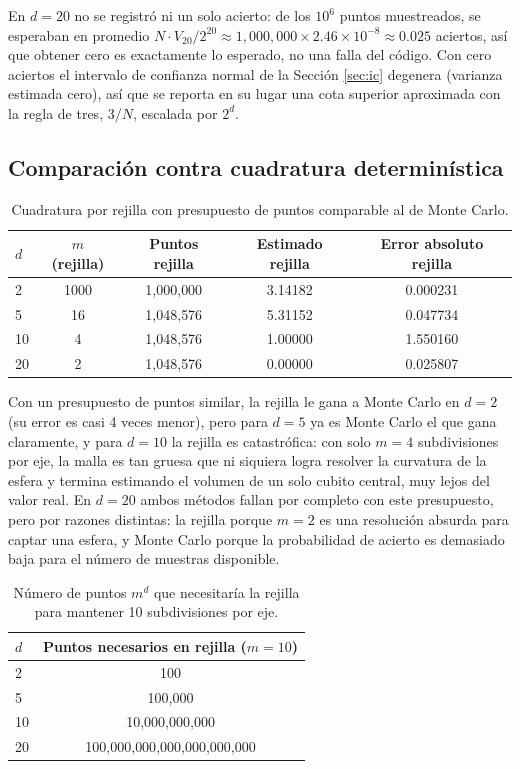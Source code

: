 \documentclass[11pt]{article}
\begin{document}
En $d=20$ no se registró ni un solo acierto: de los $10^6$ puntos muestreados, se esperaban en promedio $N \cdot V_{20}/2^{20} \approx 1{,}000{,}000 \times 2.46\times 10^{-8} \approx 0.025$ aciertos, así que obtener cero es exactamente lo esperado, no una falla del código. Con cero aciertos el intervalo de confianza normal de la Sección \ref{sec:ic} degenera (varianza estimada cero), así que se reporta en su lugar una cota superior aproximada con la regla de tres, $3/N$, escalada por $2^d$.

\subsection{Comparación contra cuadratura determinística}

\begin{table}[H]
\centering
\begin{tabular}{lcccc}
\toprule
$d$ & $m$ (rejilla) & Puntos rejilla & Estimado rejilla & Error absoluto rejilla \\
\midrule
2 & 1000 & 1{,}000{,}000 & 3.14182 & 0.000231 \\
5 & 16 & 1{,}048{,}576 & 5.31152 & 0.047734 \\
10 & 4 & 1{,}048{,}576 & 1.00000 & 1.550160 \\
20 & 2 & 1{,}048{,}576 & 0.00000 & 0.025807 \\
\bottomrule
\end{tabular}
\caption{Cuadratura por rejilla con presupuesto de puntos comparable al de Monte Carlo.}
\end{table}

Con un presupuesto de puntos similar, la rejilla le gana a Monte Carlo en $d=2$ (su error es casi 4 veces menor), pero para $d=5$ ya es Monte Carlo el que gana claramente, y para $d=10$ la rejilla es catastrófica: con solo $m=4$ subdivisiones por eje, la malla es tan gruesa que ni siquiera logra resolver la curvatura de la esfera y termina estimando el volumen de un solo cubito central, muy lejos del valor real. En $d=20$ ambos métodos fallan por completo con este presupuesto, pero por razones distintas: la rejilla porque $m=2$ es una resolución absurda para captar una esfera, y Monte Carlo porque la probabilidad de acierto es demasiado baja para el número de muestras disponible.

\begin{table}[H]
\centering
\begin{tabular}{lc}
\toprule
$d$ & Puntos necesarios en rejilla ($m=10$) \\
\midrule
2 & 100 \\
5 & 100{,}000 \\
10 & 10{,}000{,}000{,}000 \\
20 & 100{,}000{,}000{,}000{,}000{,}000{,}000 \\
\bottomrule
\end{tabular}
\caption{Número de puntos $m^d$ que necesitaría la rejilla para mantener 10 subdivisiones por eje.}
\end{table}
\end{document}
